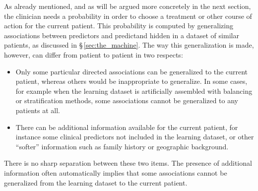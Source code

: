 \documentclass[utf8]{FrontiersinHarvard_mod} %
\newcommand*{\sect}{\S}%
\renewcommand*{\|}[1][]{\nonscript\:#1\vert\nonscript\:\mathopen{}}
\begin{document}
As already mentioned, and as will be argued more concretely in the next section, the clinician needs a probability in order to choose a treatment or other course of action for the current patient. This probability is computed by generalizing associations between predictors and predictand hidden in a dataset of similar patients, as discussed in \sect\,\ref{sec:the_machine}. The way this generalization is made, however, can differ from patient to patient in two respects:
\begin{itemize}
\item Only some particular directed associations can be generalized to the current patient, whereas others would be inappropriate to generalize. In some cases, for example when the learning dataset is artificially assembled with balancing or stratification methods, some associations cannot be generalized to any patients at all.
\item There can be additional information available for the current patient, for instance some clinical predictors not included in the learning dataset, or other \enquote{softer} information such as family history or geographic background.
\end{itemize}
There is no sharp separation between these two items. The presence of additional information often automatically implies that some associations cannot be generalized from the learning dataset to the current patient.
\end{document}
